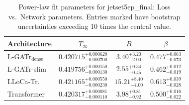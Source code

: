 \begin{table}[h]
  \centering
  \begin{tabular}{lccc}
    \toprule
    Architecture & $T_\infty$ & $B$ & $\beta$ \\
    \midrule
    L-GATr$_\mathrm{dense}$ & $0.420715^{+0.000620}_{-0.000700}$ & $3.40^{+3.20}_{-2.00}$ & $0.477^{+0.063}_{-0.073}$ \\
    L-GATr-slim & $0.419756^{+0.000150}_{-0.000130}$ & $2.55^{+0.34}_{-0.45}$ & $0.462^{+0.012}_{-0.019}$ \\
    LLoCa-Tr. & $0.421165^{+0.000550}_{-0.000230}$ & $15.21^{+8.40}_{-4.00}$ & $0.613^{+0.039}_{-0.028}$ \\
    Transformer & $0.420317^{+0.000081}_{-0.000110}$ & $3.98^{+0.81}_{-0.92}$ & $0.500^{+0.016}_{-0.022}$ \\
    \bottomrule
  \end{tabular}
  \caption{Power-law fit parameters for jetset5ep\_final: Loss vs.\ Network parameters. Entries marked \textemdash{} have bootstrap uncertainties exceeding 10 times the central value.}
  \label{tab:jetset5ep_final}
\end{table}
